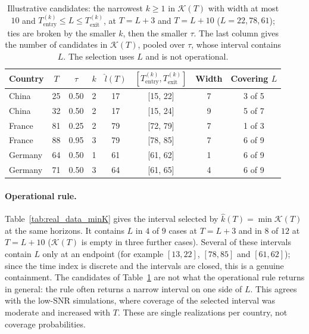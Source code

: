 \documentclass[12pt,a4paper]{article}
\begin{document}
\begin{table}[htbp]
	\centering
	\small
	\caption{Illustrative candidates: the narrowest $k\ge1$ in
		$\mathcal K(T)$ with width at most $10$ and
		$T_{\mathrm{entry}}^{(k)}\le L\le T_{\mathrm{exit}}^{(k)}$, at $T=L+3$
		and $T=L+10$ ($L=22,78,61$); ties are broken by the smaller $k$,
		then the smaller $\tau$. The last column gives the number of
		candidates in $\mathcal K(T)$, pooled over $\tau$, whose interval
		contains $L$. The selection uses $L$ and is not operational.}
	\label{tab:real_data_intervals}
	\begin{tabular}{lccccccc}
		\toprule
		Country & $T$ & $\tau$ & $k$ & $\widehat l(T)$
		& $[T_{\mathrm{entry}}^{(k)},T_{\mathrm{exit}}^{(k)}]$ & Width
		& Covering $L$ \\
		\midrule
		China   & 25 & 0.50 & 2 & 17 & [15, 22] & 7 & 3 of 5 \\
		China   & 32 & 0.50 & 2 & 17 & [15, 24] & 9 & 5 of 7 \\
		France  & 81 & 0.25 & 2 & 79 & [72, 79] & 7 & 1 of 3 \\
		France  & 88 & 0.95 & 3 & 79 & [78, 85] & 7 & 6 of 9 \\
		Germany & 64 & 0.50 & 1 & 61 & [61, 62] & 1 & 6 of 9 \\
		Germany & 71 & 0.50 & 3 & 64 & [61, 65] & 4 & 6 of 9 \\
		\bottomrule
	\end{tabular}
\end{table}

\paragraph{Operational rule.}
Table~\ref{tab:real_data_minK} gives the interval selected by
$\hat k(T)=\min\mathcal K(T)$ at the same horizons. It contains
$L$ in $4$ of $9$ cases at $T=L+3$ and in $8$ of $12$ at $T=L+10$
($\mathcal K(T)$ is empty in three further cases). Several of these
intervals contain $L$ only at an endpoint (for example $[13,22]$,
$[78,85]$ and $[61,62]$); since the time index is discrete and the
intervals are closed, this is a genuine containment. The candidates of
Table~\ref{tab:real_data_intervals} are not what the operational
rule returns in general: the rule often returns a narrow interval on one
side of $L$. This agrees with the low-SNR simulations, where coverage
of the selected interval was moderate and increased with $T$. These
are single realizations per country, not coverage probabilities.
\end{document}
